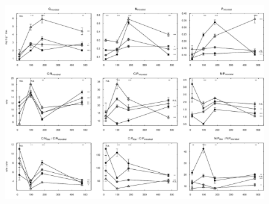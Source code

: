 \documentclass[10pt]{article}
\begin{document}
\begin{flushleft}
\begin{figure}[!ht]
\begin{center}
\includegraphics{ligpaper-mb}
\end{center}
\end{figure}


\end{flushleft}
\end{document}
